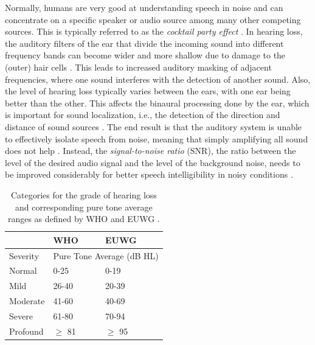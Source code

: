 \documentclass[english, 12pt, a4paper, pdftex, elec, utf8]{aaltothesis}
\begin{document}
Normally, humans are very good at understanding speech in noise and can concentrate on a specific speaker or audio source among many other competing sources. This is typically referred to as the \textit{cocktail party effect} \cite{bronkhorst2000cocktail}. In hearing loss, the auditory filters of the ear that divide the incoming sound into different frequency bands can become wider and more shallow due to damage to the (outer) hair cells \cite{moore2007cochlear}. This leads to increased auditory masking of adjacent frequencies, where one sound interferes with the detection of another sound. Also, the level of hearing loss typically varies between the ears, with one ear being better than the other. This affects the binaural processing done by the ear, which is important for sound localization, i.e., the detection of the direction and distance of sound sources \cite{moore2007cochlear, pulkki2015communication}. The end result is that the auditory system is unable to effectively isolate speech from noise, meaning that simply amplifying all sound does not help \cite[p.~233--234]{moore2007cochlear}. Instead, the \textit{signal-to-noise ratio} (SNR), the ratio between the level of the desired audio signal and the level of the background noise, needs to be improved considerably for better speech intelligibility in noisy conditions \cite{healy2016difficulty, fink2008benefit}.
\begin{table}[t]
	\renewcommand{\arraystretch}{1.2}  %
	\setlength{\tabcolsep}{32pt}                %
	\centering
	\caption{Categories for the grade of hearing loss and corresponding pure tone average ranges as defined by WHO and EUWG \cite{salonen2013hearing}.}
	\label{table:hearingloss}
	\begin{tabular}{@{}lll@{}}
		\toprule
		& \textbf{WHO}        & \textbf{EUWG}        							\\ \midrule
		Severity 	& \multicolumn{2}{l}{Pure Tone Average (dB HL)} 	 \\ \midrule
		Normal   	& 0-25                		& 0-19                 					\\
		Mild     		& 26-40               		& 20-39                				\\
		Moderate 	& 41-60               		& 40-69                				\\
		Severe   		& 61-80               		& 70-94                				\\
		Profound 		& $\geqslant$ 81        & $\geqslant$ 95         \\ \bottomrule
	\end{tabular}
	\vspace{2mm}
\end{table}
\end{document}
